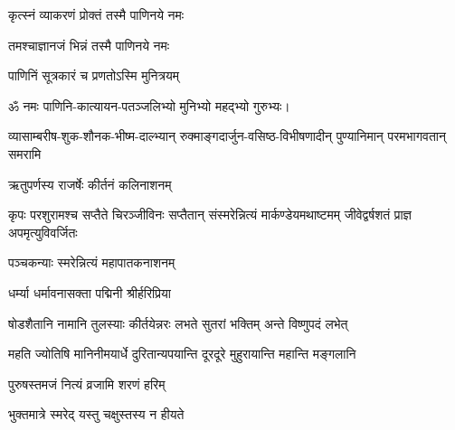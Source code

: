\begin{center}

{कृत्स्नं व्याकरणं प्रोक्तं तस्मै पाणिनये नमः}

{तमश्चाज्ञानजं भिन्नं तस्मै पाणिनये नमः}

{पाणिनिं सूत्रकारं च प्रणतोऽस्मि मुनित्रयम्}

ॐ नमः पाणिनि-कात्यायन-पतञ्जलिभ्यो मुनिभ्यो महद्भ्यो गुरुभ्यः। 




{व्यासाम्बरीष-शुक-शौनक-भीष्म-दाल्भ्यान्}
{रुक्माङ्गदार्जुन-वसिष्ठ-विभीषणादीन्}
{पुण्यानिमान् परमभागवतान् समरामि}


{ऋतुपर्णस्य राजर्षेः कीर्तनं कलिनाशनम्}

{कृपः परशुरामश्च सप्तैते चिरञ्जीविनः}
{सप्तैतान् संस्मरेन्नित्यं मार्कण्डेयमथाष्टमम्}
{जीवेद्वर्षशतं प्राज्ञ अपमृत्युविवर्जितः}

{पञ्चकन्याः स्मरेन्नित्यं महापातकनाशनम्}

 


{धर्म्या धर्मावनासक्ता पद्मिनी श्रीर्हरिप्रिया}

{षोडशैतानि नामानि तुलस्याः कीर्तयेन्नरः}
{लभते सुतरां भक्तिम् अन्ते विष्णुपदं लभेत्}

{महति ज्योतिषि मानिनीमयार्धे}
{दुरितान्यपयान्ति दूरदूरे}
{मुहुरायान्ति महान्ति मङ्गलानि}


{पुरुषस्तमजं नित्यं व्रजामि शरणं हरिम्}


{भुक्तमात्रे स्मरेद् यस्तु चक्षुस्तस्य न हीयते}


\end{center}
